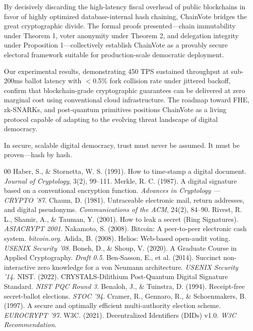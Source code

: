 \documentclass[journal,10pt,twocolumn]{IEEEtran}
\begin{document}
By decisively discarding the high-latency fiscal overhead of public blockchains in favor of highly optimized database-internal hash chaining, ChainVote bridges the great cryptographic divide. The formal proofs presented—chain immutability under Theorem 1, voter anonymity under Theorem 2, and delegation integrity under Proposition 1—collectively establish ChainVote as a provably secure electoral framework suitable for production-scale democratic deployment.

Our experimental results, demonstrating 450 TPS sustained throughput at sub-200ms ballot latency with $<$0.5\% fork collision rate under jittered backoff, confirm that blockchain-grade cryptographic guarantees can be delivered at zero marginal cost using conventional cloud infrastructure. The roadmap toward FHE, zk-SNARKs, and post-quantum primitives positions ChainVote as a living protocol capable of adapting to the evolving threat landscape of digital democracy.

In secure, scalable digital democracy, trust must never be assumed. It must be proven—hash by hash.

\begin{thebibliography}{00}
 Haber, S., \& Stornetta, W. S. (1991). How to time-stamp a digital document. \textit{Journal of Cryptology}, 3(2), 99--111.
 Merkle, R. C. (1987). A digital signature based on a conventional encryption function. \textit{Advances in Cryptology — CRYPTO '87}.
 Chaum, D. (1981). Untraceable electronic mail, return addresses, and digital pseudonyms. \textit{Communications of the ACM}, 24(2), 84--90.
 Rivest, R. L., Shamir, A., \& Tauman, Y. (2001). How to leak a secret (Ring Signatures). \textit{ASIACRYPT 2001}.
 Nakamoto, S. (2008). Bitcoin: A peer-to-peer electronic cash system. \textit{bitcoin.org}.
 Adida, B. (2008). Helios: Web-based open-audit voting. \textit{USENIX Security '08}.
 Boneh, D., \& Shoup, V. (2020). A Graduate Course in Applied Cryptography. \textit{Draft 0.5}.
 Ben-Sasson, E., et al. (2014). Succinct non-interactive zero knowledge for a von Neumann architecture. \textit{USENIX Security '14}.
 NIST. (2022). CRYSTALS-Dilithium Post-Quantum Digital Signature Standard. \textit{NIST PQC Round 3}.
 Benaloh, J., \& Tuinstra, D. (1994). Receipt-free secret-ballot elections. \textit{STOC '94}.
 Cramer, R., Gennaro, R., \& Schoenmakers, B. (1997). A secure and optimally efficient multi-authority election scheme. \textit{EUROCRYPT '97}.
 W3C. (2021). Decentralized Identifiers (DIDs) v1.0. \textit{W3C Recommendation}.
\end{thebibliography}
\end{document}
